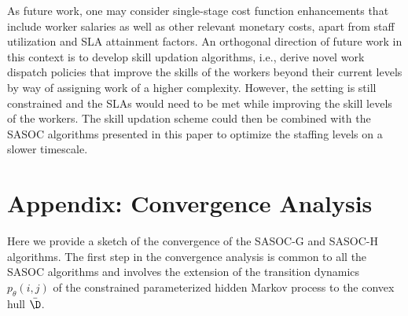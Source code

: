 \documentclass[11pt,letterpaper,english]{article}
\begin{document}
As future work, one may consider single-stage cost function enhancements that
include worker salaries as well as other relevant monetary costs, apart from staff
utilization and SLA attainment factors. 
An orthogonal direction of future work in this context is to
develop skill updation algorithms, i.e., derive novel work dispatch policies
that improve the skills of the workers beyond their current levels by way of
assigning work of a higher complexity. However, the setting is still constrained
and the SLAs would need to be met while improving the skill levels of the
workers. The skill updation scheme could then be combined  with the SASOC
algorithms presented in this paper to optimize the
staffing levels on a slower timescale.

\newpage
\appendix
\section{Appendix: Convergence Analysis}
Here we provide a sketch of the convergence of the SASOC-G and SASOC-H algorithms. The first step in the convergence analysis is common to all the SASOC algorithms and involves the extension of the transition dynamics $p_\theta(i,j)$ of the constrained parameterized hidden Markov process to the convex hull $\bar\D$.
\end{document}

